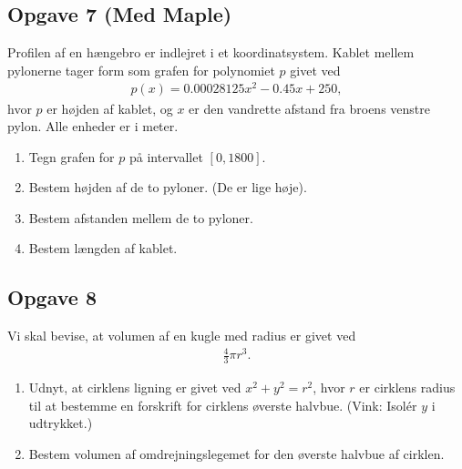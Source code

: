 \subsection*{Opgave 7 (Med Maple)}
Profilen af en hængebro er indlejret i et koordinatsystem. Kablet mellem pylonerne tager form som grafen for polynomiet $p$ givet ved
\begin{align*}
	p(x) = 0.00028125x^2 -0.45x + 250,
\end{align*}
hvor $p$ er højden af kablet, og $x$ er den vandrette afstand fra broens venstre pylon. Alle enheder er i meter.
\begin{enumerate}[label=\roman*)]
	\item Tegn grafen for $p$ på intervallet $[0,1800]$. 
	\item Bestem højden af de to pyloner. (De er lige høje).
	\item Bestem afstanden mellem de to pyloner. 
	\item Bestem længden af kablet.
\end{enumerate}

\subsection*{Opgave 8}
Vi skal bevise, at volumen af en kugle med radius er givet ved
\begin{align*}
	\frac{4}{3}\pi r^3.
\end{align*}
\begin{enumerate}[label=\roman*)]
	\item Udnyt, at cirklens ligning er givet ved $x^2 + y^2 = r^2$, hvor $r$ er cirklens radius til at bestemme en 
	forskrift for cirklens øverste halvbue. (Vink: Isolér $y$ i udtrykket.)
	\item Bestem volumen af omdrejningslegemet for den øverste halvbue af cirklen. 
\end{enumerate}